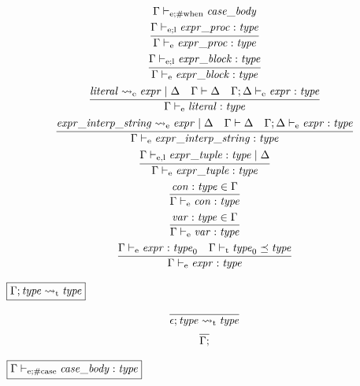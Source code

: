 \begin{gather*}
{        \Gamma \vdash_{\mathrm{e}; \mathrm{\#when}} \mathit{case\_body}
    }
    \\
    \infer{\Gamma \vdash_\mathrm{e} \mathit{expr\_proc}: \mathit{type}}{
        \Gamma \vdash_{\mathrm{e}; \mathrm{l}} \mathit{expr\_proc}: \mathit{type}
    }
    \\
    \infer{\Gamma \vdash_\mathrm{e} \mathit{expr\_block}: \mathit{type}}{
        \Gamma \vdash_{\mathrm{e}; \mathrm{l}} \mathit{expr\_block}: \mathit{type}
    }
    \\
    \infer{\Gamma \vdash_\mathrm{e} \mathit{literal}: \mathit{type}}{
        \mathit{literal} \rightsquigarrow_\mathrm{e} \mathit{expr} \mid \Delta
        &
        \Gamma \vdash \Delta
        &
        \Gamma; \Delta \vdash_\mathrm{e} \mathit{expr}: \mathit{type}
    }
    \\
    \infer{\Gamma \vdash_\mathrm{e} \mathit{expr\_interp\_string}: \mathit{type}}{
        \mathit{expr\_interp\_string} \rightsquigarrow_\mathrm{e} \mathit{expr} \mid \Delta
        &
        \Gamma \vdash \Delta
        &
        \Gamma; \Delta \vdash_\mathrm{e} \mathit{expr}: \mathit{type}
    }
    \\
    \infer{\Gamma \vdash_\mathrm{e} \mathit{expr\_tuple}: \mathit{type}}{
        \Gamma \vdash_{\mathrm{e}, \mathrm{l}} \mathit{expr\_tuple}: \mathit{type} \mid \Delta
    }
    \\
    \infer{\Gamma \vdash_\mathrm{e} \mathit{con}: \mathit{type}}{
        \mathit{con}: \mathit{type} \in \Gamma
    }
    \\
    \infer{\Gamma \vdash_\mathrm{e} \mathit{var}: \mathit{type}}{
        \mathit{var}: \mathit{type} \in \Gamma
    }
    \\
    \infer{\Gamma \vdash_\mathrm{e} \mathit{expr}: \mathit{type}}{
        \Gamma \vdash_\mathrm{e} \mathit{expr}: \mathit{type}_0
        &
        \Gamma \vdash_\mathrm{t} \mathit{type}_0 \preceq \mathit{type}
    }
\end{gather*}

$\fbox{$\Gamma; \mathit{type} \rightsquigarrow_\mathrm{t} \mathit{type}$}$

\begin{gather*}
    \infer{\epsilon; \mathit{type} \rightsquigarrow_\mathrm{t} \mathit{type}}{}
    \\
    \infer{\Gamma; }{}
\end{gather*}

$\fbox{$\Gamma \vdash_{\mathrm{e}; \mathrm{\#case}} \mathit{case\_body}: \mathit{type}$}$

